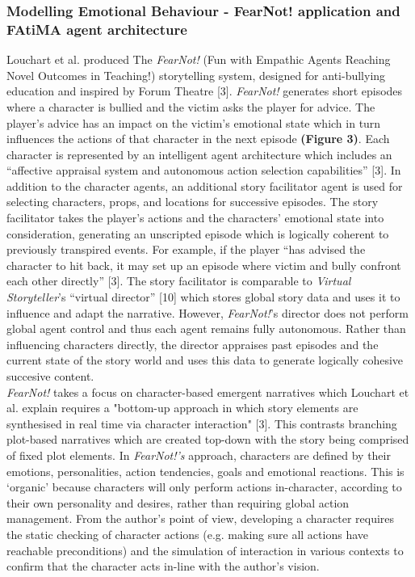 \documentclass{sig-alternate-05-2015}
\begin{document}
\subsubsection{Modelling Emotional Behaviour - FearNot! application and FAtiMA agent architecture}
Louchart et al. produced The \textit{FearNot!} (Fun with Empathic Agents Reaching Novel Outcomes in Teaching!) storytelling system, designed for anti-bullying education and inspired by Forum Theatre [3]. \textit{FearNot!} generates short episodes where a character is bullied and the victim asks the player for advice. The player's advice has an impact on the victim's emotional state which in turn influences the actions of that character in the next episode \textbf{(Figure 3)}. Each character is represented by an intelligent agent architecture which includes an ``affective appraisal system and autonomous action selection capabilities'' [3]. In addition to the character agents, an additional story facilitator agent is used for selecting characters, props, and locations for successive episodes. The story facilitator takes the player's actions and the characters' emotional state into consideration, generating an unscripted episode which is logically coherent to previously transpired events. For example, if the player ``has advised the character to hit back, it may set up an episode where victim and bully confront each other directly'' [3]. The story facilitator is comparable to \textit{Virtual Storyteller}'s ``virtual director'' [10] which stores global story data and uses it to influence and adapt the narrative. However, \textit{FearNot!}'s director does not perform global agent control and thus each agent remains fully autonomous. Rather than influencing characters directly, the director appraises past episodes and the current state of the story world and uses this data to generate logically cohesive succesive content.\\

\textit{FearNot!} takes a focus on character-based emergent narratives which Louchart et al. explain requires a "bottom-up approach in which story elements are synthesised in real time via character interaction" [3]. This contrasts branching plot-based narratives which are created top-down with the story being comprised of fixed plot elements. In \textit{FearNot!'s} approach, characters are defined by their emotions, personalities, action tendencies, goals and emotional reactions. This is `organic' because characters will only perform actions in-character, according to their own personality and desires, rather than requiring global action management. From the author's point of view, developing a character requires the static checking of character actions (e.g. making sure all actions have reachable preconditions) and the simulation of interaction in various contexts to confirm that the character acts in-line with the author's vision.\\
\end{document}

